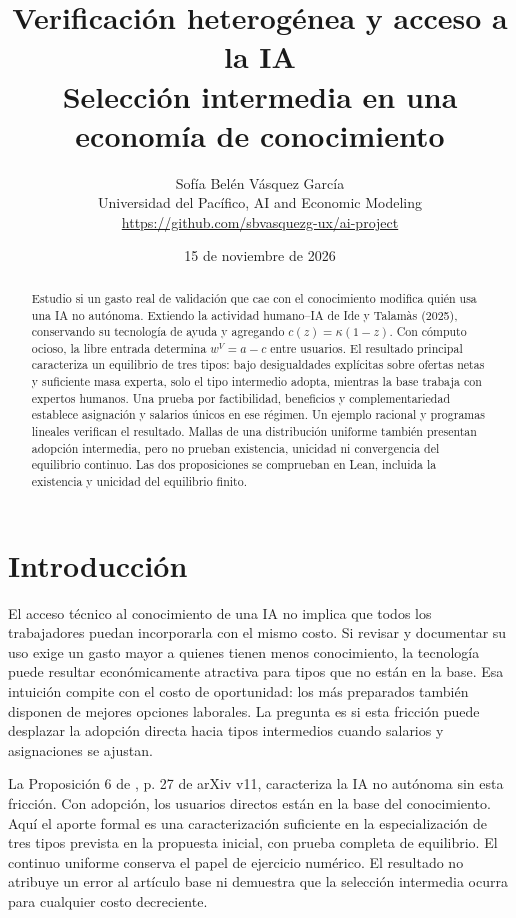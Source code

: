 \documentclass[11pt]{article}
\title{Verificación heterogénea y acceso a la IA\\\large Selección intermedia en una economía de conocimiento}
\author{Sofía Belén Vásquez García\\\small Universidad del Pacífico, AI and Economic Modeling\\\small\url{https://github.com/sbvasquezg-ux/ai-project}}
\date{15 de noviembre de 2026}
\begin{document}
\maketitle
\begin{abstract}\noindent
Estudio si un gasto real de validación que cae con el conocimiento modifica quién usa una IA no autónoma. Extiendo la actividad humano--IA de Ide y Talamàs (2025), conservando su tecnología de ayuda y agregando $c(z)=\kappa(1-z)$. Con cómputo ocioso, la libre entrada determina $w^V=a-c$ entre usuarios. El resultado principal caracteriza un equilibrio de tres tipos: bajo desigualdades explícitas sobre ofertas netas y suficiente masa experta, solo el tipo intermedio adopta, mientras la base trabaja con expertos humanos. Una prueba por factibilidad, beneficios y complementariedad establece asignación y salarios únicos en ese régimen. Un ejemplo racional y programas lineales verifican el resultado. Mallas de una distribución uniforme también presentan adopción intermedia, pero no prueban existencia, unicidad ni convergencia del equilibrio continuo. Las dos proposiciones se comprueban en Lean, incluida la existencia y unicidad del equilibrio finito.
\end{abstract}
\section{Introducción}
El acceso técnico al conocimiento de una IA no implica que todos los trabajadores puedan incorporarla con el mismo costo. Si revisar y documentar su uso exige un gasto mayor a quienes tienen menos conocimiento, la tecnología puede resultar económicamente atractiva para tipos que no están en la base. Esa intuición compite con el costo de oportunidad: los más preparados también disponen de mejores opciones laborales. La pregunta es si esta fricción puede desplazar la adopción directa hacia tipos intermedios cuando salarios y asignaciones se ajustan.

La Proposición 6 de \citet{ide2025}, p. 27 de arXiv v11, caracteriza la IA no autónoma sin esta fricción. Con adopción, los usuarios directos están en la base del conocimiento. Aquí el aporte formal es una caracterización suficiente en la especialización de tres tipos prevista en la propuesta inicial, con prueba completa de equilibrio. El continuo uniforme conserva el papel de ejercicio numérico. El resultado no atribuye un error al artículo base ni demuestra que la selección intermedia ocurra para cualquier costo decreciente.
\end{document}
